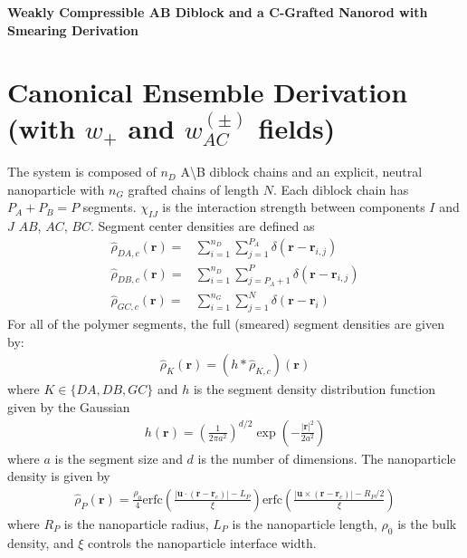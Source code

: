 \documentclass{article}
\begin{document}
\begin{center}
  \textbf{Weakly Compressible AB Diblock and a C-Grafted Nanorod with
  Smearing Derivation}
\end{center}

\section{Canonical Ensemble Derivation (with $w_+$ and $w_{AC}^{(\pm)}$ fields)}

The system is composed of $n_D$ A\textbackslash B diblock chains and an explicit, neutral
  nanoparticle with $n_G$ grafted chains of length $N$.
Each diblock chain has $P_A + P_B = P$ segments.
$\chi_{IJ}$ is the interaction strength between components $I$ and $J$
  $AB$, $AC$, $BC$.
Segment center densities are defined as
\begin{align*}
  \hat{\rho}_{DA,c} (\mathbf{r}) =&
    \sum_{i=1}^{n_D} \sum_{j=1}^{P_A}
    \delta(\mathbf{r} - \mathbf{r}_{i,j}) \\
  \hat{\rho}_{DB,c} (\mathbf{r}) =&
    \sum_{i=1}^{n_D} \sum_{j=P_A+1}^{P}
    \delta(\mathbf{r} - \mathbf{r}_{i,j}) \\
  \hat{\rho}_{GC,c} (\mathbf{r}) =&
    \sum_{i=1}^{n_G} \sum_{j=1}^{N}
    \delta(\mathbf{r} - \mathbf{r}_i)
\end{align*}
For all of the polymer segments, the full (smeared) segment densities are given
  by:
\begin{align*}
  \hat{\rho}_K(\mathbf{r}) = (h \ast \hat{\rho}_{K,c})(\mathbf{r})
\end{align*}
where $K \in \{ DA, DB, GC\}$ and $h$ is the segment density distribution
  function given by the Gaussian
\begin{align*}
  h(\mathbf{r}) = \left( \frac{1}{2\pi a^2} \right)^{d/2}
  \exp \left( - \frac{|\mathbf{r}|^2}{2a^2}  \right)
\end{align*}
where $a$ is the segment size and $d$ is the number of dimensions.
The nanoparticle density is given by
\begin{align*}
  \hat{\rho}_P(\mathbf{r}) =
    \frac{\rho_0}{4}
    \textrm{erfc} \left(
      \frac{|\mathbf{u} \cdot (\mathbf{r} - \mathbf{r}_c)| - L_P}{\xi} 
    \right)
    \textrm{erfc} \left(
      \frac{|\mathbf{u} \times (\mathbf{r} - \mathbf{r}_c)| - R_P/2}{\xi}       
    \right)
\end{align*}
where $R_P$ is the nanoparticle radius, $L_P$ is the nanoparticle length, $\rho_0$ is the bulk density,
  and $\xi$ controls the nanoparticle interface width.
\end{document}
